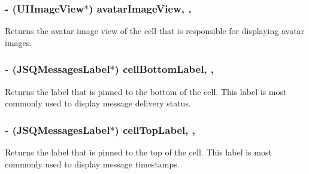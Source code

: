 \subsubsection[{avatar\+Image\+View}]{\setlength{\rightskip}{0pt plus 5cm}-\/ (U\+I\+Image\+View$\ast$) avatar\+Image\+View\hspace{0.3cm}{\ttfamily [read]}, {\ttfamily [nonatomic]}, {\ttfamily [weak]}}\label{interface_j_s_q_messages_collection_view_cell_a23cc2af0baa373c2c6712d399ac88999}
Returns the avatar image view of the cell that is responsible for displaying avatar images. \hypertarget{interface_j_s_q_messages_collection_view_cell_a324cc242829d32cc3662bd606dd15994}{}
\subsubsection[{cell\+Bottom\+Label}]{\setlength{\rightskip}{0pt plus 5cm}-\/ ({\bf J\+S\+Q\+Messages\+Label}$\ast$) cell\+Bottom\+Label\hspace{0.3cm}{\ttfamily [read]}, {\ttfamily [nonatomic]}, {\ttfamily [weak]}}\label{interface_j_s_q_messages_collection_view_cell_a324cc242829d32cc3662bd606dd15994}
Returns the label that is pinned to the bottom of the cell. This label is most commonly used to display message delivery status. \hypertarget{interface_j_s_q_messages_collection_view_cell_aa80fd02c40852bdcb3a0ff5b8e91a650}{}
\subsubsection[{cell\+Top\+Label}]{\setlength{\rightskip}{0pt plus 5cm}-\/ ({\bf J\+S\+Q\+Messages\+Label}$\ast$) cell\+Top\+Label\hspace{0.3cm}{\ttfamily [read]}, {\ttfamily [nonatomic]}, {\ttfamily [weak]}}\label{interface_j_s_q_messages_collection_view_cell_aa80fd02c40852bdcb3a0ff5b8e91a650}
Returns the label that is pinned to the top of the cell. This label is most commonly used to display message timestamps. \hypertarget{interface_j_s_q_messages_collection_view_cell_a4b7a40e8a0fc1a0e32c8817286385737}{}
